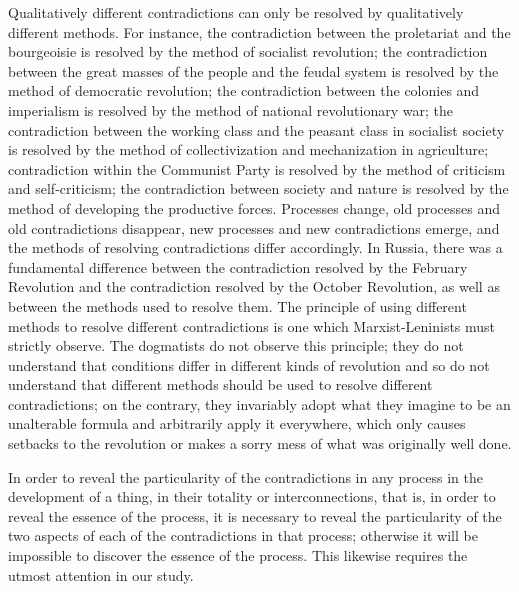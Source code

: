 \documentclass{article}
\begin{document}
Qualitatively different contradictions can only be resolved by qualitatively
different methods. For instance, the contradiction between the proletariat and
the bourgeoisie is resolved by the method of socialist revolution; the
contradiction between the great masses of the people and the feudal system is
resolved by the method of democratic revolution; the contradiction between the
colonies and imperialism is resolved by the method of national revolutionary
war; the contradiction between the working class and the peasant class in
socialist society is resolved by the method of collectivization and
mechanization in agriculture; contradiction within the Communist Party is
resolved by the method of criticism and self-criticism; the contradiction
between society and nature is resolved by the method of developing the
productive forces. Processes change, old processes and old contradictions
disappear, new processes and new contradictions emerge, and the methods of
resolving contradictions differ accordingly. In Russia, there was a fundamental
difference between the contradiction resolved by the February Revolution and
the contradiction resolved by the October Revolution, as well as between the
methods used to resolve them. The principle of using different methods to
resolve different contradictions is one which Marxist-Leninists must strictly
observe. The dogmatists do not observe this principle; they do not understand
that conditions differ in different kinds of revolution and so do not
understand that different methods should be used to resolve different
contradictions; on the contrary, they invariably adopt what they imagine to be
an unalterable formula and arbitrarily apply it everywhere, which only causes
setbacks to the revolution or makes a sorry mess of what was originally well
done.

In order to reveal the particularity of the contradictions in any process in
the development of a thing, in their totality or interconnections, that is, in
order to reveal the essence of the process, it is necessary to reveal the
particularity of the two aspects of each of the contradictions in that process;
otherwise it will be impossible to discover the essence of the process. This
likewise requires the utmost attention in our study.
\end{document}
